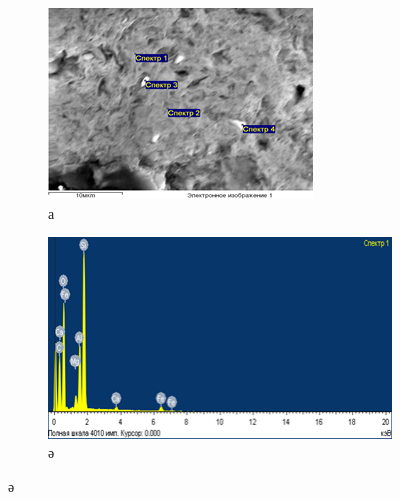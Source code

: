 \begin{figure}[H]
    \centering
    \begin{subfigure}[b]{0.45\textwidth}
        \centering
        \includegraphics[width=\textwidth]{assets/1043}
        \caption*{а}
    \end{subfigure}
    \hfill
    \begin{subfigure}[b]{0.45\textwidth}
        \centering
        \includegraphics[width=\textwidth]{assets/1043.1}
        \caption*{ә}
    \end{subfigure}
\end{figure}

